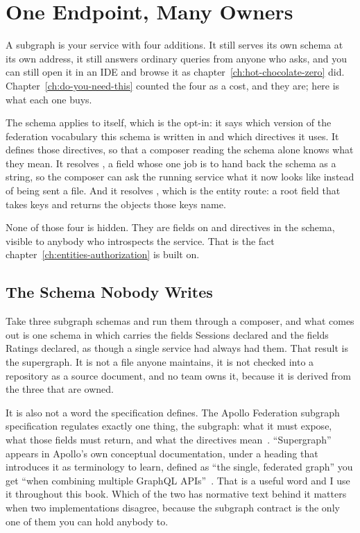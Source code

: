 \section{One Endpoint, Many Owners}
\label{sec:ch05-one-endpoint-many-owners}

%
A subgraph is your service with four additions. It still serves its own schema
at its own address, it still answers ordinary queries from anyone who asks, and
you can still open it in an IDE and browse it as chapter~\ref{ch:hot-chocolate-zero}
did. Chapter~\ref{ch:do-you-need-this} counted the four as a cost, and they are;
here is what each one buys.

%
%
%
The schema applies  to itself, which is the opt-in: it says which
version of the federation vocabulary this schema is written in and which
directives it uses. It defines those directives, so that a composer reading the
schema alone knows what they mean. It resolves , a field whose
one job is to hand back the schema as a string, so the composer can ask the
running service what it now looks like instead of being sent a file. And it
resolves , which is the entity route: a root field that takes
keys and returns the objects those keys name.

%
None of those four is hidden. They are fields on  and directives in
the schema, visible to anybody who introspects the service. That is the fact
chapter~\ref{ch:entities-authorization} is built on.

\subsection{The Schema Nobody Writes}

%
Take three subgraph schemas and run them through a composer, and what comes out
is one schema in which  carries the fields Sessions declared and
the fields Ratings declared, as though a single service had always had them.
That result is the supergraph. It is not a file anyone maintains, it is not
checked into a repository as a source document, and no team owns it, because it
is derived from the three that are owned.

%
It is also not a word the specification defines. The Apollo Federation subgraph
specification regulates exactly one thing, the subgraph: what it must expose,
what those fields must return, and what the directives mean~\autocite{apollosubgraphspec}.
\enquote{Supergraph} appears in Apollo's own conceptual documentation, under a
heading that introduces it as terminology to learn, defined as \enquote{the
single, federated graph} you get \enquote{when combining multiple GraphQL
APIs}~\autocite{apollofederatedschemas}. That is a useful word and I use it
throughout this book. Which of the two has normative text behind it matters
when two implementations disagree, because the subgraph contract is the only
one of them you can hold anybody to.

